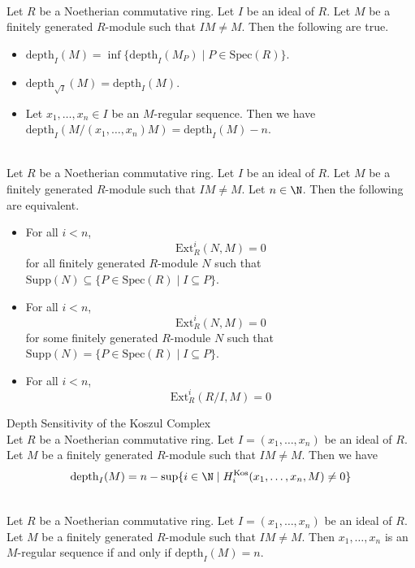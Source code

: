 \documentclass[a4paper]{article}
\begin{document}
\begin{prp}{}{}\\
Let $R$ be a Noetherian commutative ring. Let $I$ be an ideal of $R$. Let $M$ be a finitely generated $R$-module such that $IM\neq M$. Then the following are true. 
\begin{itemize}
\item $\text{depth}_I(M)=\inf\{\text{depth}_I(M_P)\;|\;P\in\text{Spec}(R)\}$. 
\item $\text{depth}_{\sqrt{I}}(M)=\text{depth}_I(M)$. 
\item Let $x_1,\dots,x_n\in I$ be an $M$-regular sequence. Then we have $\text{depth}_I(M/(x_1,\dots,x_n)M)=\text{depth}_I(M)-n$. 
\end{itemize}
\end{prp}
\begin{prp}{}{}\\
Let $R$ be a Noetherian commutative ring. Let $I$ be an ideal of $R$. Let $M$ be a finitely generated $R$-module such that $IM\neq M$. Let $n\in\N$. Then the following are equivalent. 
\begin{itemize}
\item For all $i<n$, $$\text{Ext}_R^i(N,M)=0$$ for all finitely generated $R$-module $N$ such that $\text{Supp}(N)\subseteq\{P\in\text{Spec}(R)\;|\;I\subseteq P\}$. 
\item For all $i<n$, $$\text{Ext}_R^i(N,M)=0$$ for some finitely generated $R$-module $N$ such that $\text{Supp}(N)=\{P\in\text{Spec}(R)\;|\;I\subseteq P\}$. 
\item For all $i<n$, $$\text{Ext}_R^i\left(R/I,M\right)=0$$
\end{itemize}
\end{prp}

\begin{prp}{Depth Sensitivity of the Koszul Complex}{}\\
Let $R$ be a Noetherian commutative ring. Let $I=(x_1,\dots,x_n)$ be an ideal of $R$. Let $M$ be a finitely generated $R$-module such that $IM\neq M$. Then we have $$\text{depth}_I(M)=n-\sup\{i\in\N\;|\;H_i^\text{Kos}(x_1,\dots,x_n,M)\neq 0\}$$
\end{prp}

\begin{crl}{}{}\\
Let $R$ be a Noetherian commutative ring. Let $I=(x_1,\dots,x_n)$ be an ideal of $R$. Let $M$ be a finitely generated $R$-module such that $IM\neq M$. Then $x_1,\dots,x_n$ is an $M$-regular sequence if and only if $\text{depth}_I(M)=n$. 
\end{crl}
\end{document}
